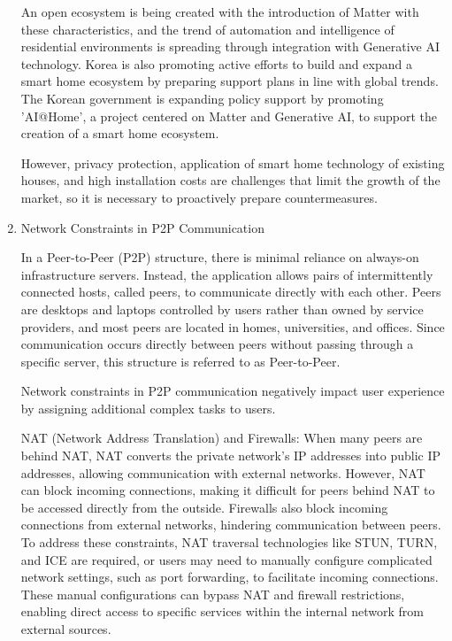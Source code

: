 \documentclass[conference]{IEEEtran}
\begin{document}
\begin{enumerate}[itemsep=2ex, parsep=1ex]
	      An open ecosystem is being created with the introduction of Matter with these characteristics, and the trend of automation and intelligence of residential environments is spreading through integration with Generative AI technology. Korea is also promoting active efforts to build and expand a smart home ecosystem by preparing support plans in line with global trends. The Korean government is expanding policy support by promoting 'AI@Home', a project centered on Matter and Generative AI, to support the creation of a smart home ecosystem.
	          
	      However, privacy protection, application of smart home technology of existing houses, and high installation costs are challenges that limit the growth of the market, so it is necessary to proactively prepare countermeasures.
	          
	\item Network Constraints in P2P Communication
	          
	      In a Peer-to-Peer (P2P) structure, there is minimal reliance on always-on infrastructure servers. Instead, the application allows pairs of intermittently connected hosts, called peers, to communicate directly with each other. Peers are desktops and laptops controlled by users rather than owned by service providers, and most peers are located in homes, universities, and offices. Since communication occurs directly between peers without passing through a specific server, this structure is referred to as Peer-to-Peer. 
	      
	      Network constraints in P2P communication negatively impact user experience by assigning additional complex tasks to users.
	          
	      NAT (Network Address Translation) and Firewalls: 
	      When many peers are behind NAT, NAT converts the private network's IP addresses into public IP addresses, allowing communication with external networks. However, NAT can block incoming connections, making it difficult for peers behind NAT to be accessed directly from the outside.
	      Firewalls also block incoming connections from external networks, hindering communication between peers.
	      To address these constraints, NAT traversal technologies like STUN, TURN, and ICE are required, or users may need to manually configure complicated network settings, such as port forwarding, to facilitate incoming connections. These manual configurations can bypass NAT and firewall restrictions, enabling direct access to specific services within the internal network from external sources.
	          

\end{enumerate}
\end{document}
